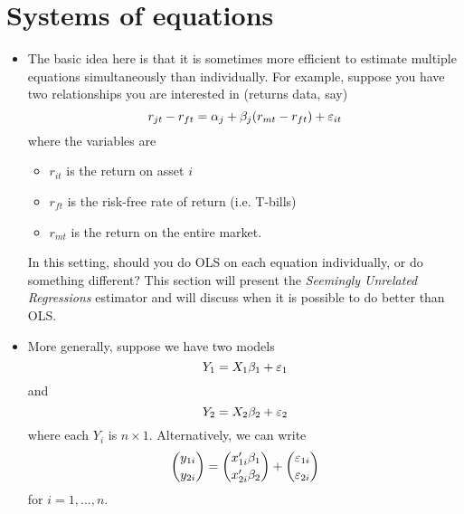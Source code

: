 

\section{Systems of equations}

\begin{itemize}[leftmargin=0pt]

\item The basic idea here is that it is sometimes more efficient to
  estimate multiple equations simultaneously than individually.  For
  example, suppose you have two relationships you are interested in
  (returns data, say)
  \begin{equation*}
    r_{jt} - r_{ft} = \alpha_j + \beta_j (r_{mt} - r_{ft}) + \varepsilon_{it}
  \end{equation*}
  where the variables are
  \begin{itemize}
  \item $r_{it}$ is the return on asset $i$
  \item $r_{ft}$ is the risk-free rate of return (i.e. T-bills)
  \item $r_{mt}$ is the return on the entire market.
  \end{itemize}

  In this setting, should you do OLS on each equation individually, or
  do something different? This section will present the
  \emph{Seemingly Unrelated Regressions} estimator and will discuss
  when it is possible to do better than OLS.

\item More generally, suppose we have two models
  \begin{equation}\label{eq:3}
    Y_1 = X_1 \beta_1 + \vep_1
  \end{equation}
  and
  \begin{equation}\label{eq:4}
    Y_2 = X_2 \beta_2 + \vep_2
  \end{equation}
  where each $Y_i$ is $n \times 1$.  Alternatively, we can write
  \begin{equation*}
    \binom{y_{1i}}{y_{2i}}
    = \binom{x_{1i}'\beta_1}{x_{2i}'\beta_2} +  \binom{\varepsilon_{1i}}{ \varepsilon_{2i}}
  \end{equation*}
  for $i = 1,...,n$.


\end{itemize}
